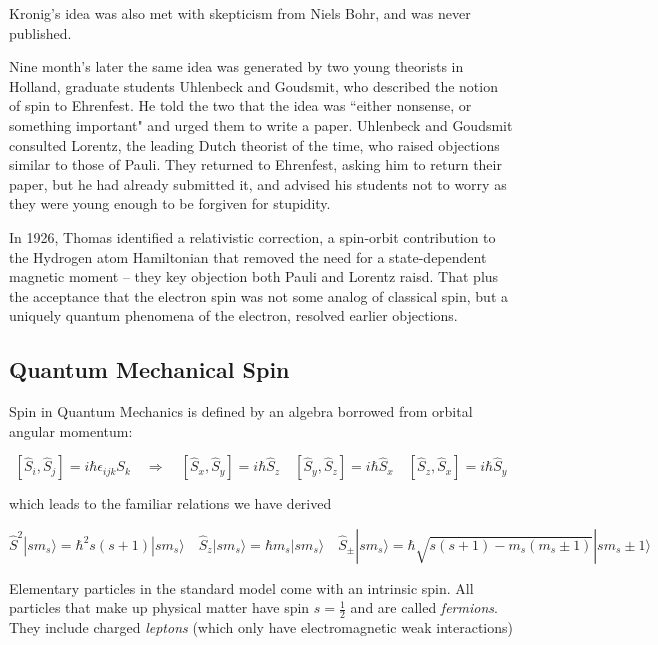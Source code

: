 Kronig's idea was also met with skepticism from Niels Bohr, and was never
published. 

Nine month's later the same idea was generated by two young theorists in
Holland, graduate students Uhlenbeck and Goudsmit, who described the notion of
spin to Ehrenfest. He told the two that the idea was ``either nonsense, or
something important" and urged them to write a paper. Uhlenbeck and Goudsmit
consulted Lorentz, the leading Dutch theorist of the time, who raised
objections similar to those of Pauli. They returned to Ehrenfest, asking him to
return their paper, but he had already submitted it, and advised his students
not to worry as they were young enough to be forgiven for stupidity. 

In 1926, Thomas identified a relativistic correction, a spin-orbit contribution
to the Hydrogen atom Hamiltonian that removed the need for a state-dependent
magnetic moment -- they key objection both Pauli and Lorentz raisd. That plus
the acceptance that the electron spin was not some analog of classical spin,
but a uniquely quantum phenomena of the electron, resolved earlier objections. 


\subsection{Quantum Mechanical Spin} 

Spin in Quantum Mechanics is defined by an algebra borrowed from orbital
angular momentum: 

\[
  [\hat{S}_i, \hat{S}_j ]  = i\hbar \epsilon_{ijk} S_k \quad \Rightarrow \quad
  [\hat{S}_x, \hat{S}_y ] = i\hbar \hat{S}_z \quad [\hat{S}_y, \hat{S}_z]
  = i\hbar \hat{S}_x \quad [\hat{S}_z, \hat{S}_x ] = i\hbar \hat{S}_y 
\] \vspace{3px}

which leads to the familiar relations we have derived 

\[
\hat{S}^2 |sm_s\rangle = \hbar^2 s(s+1)|sm_s\rangle \quad \hat{S}_z |s m_s
\rangle = \hbar m_s | sm_s \rangle \quad  \hat{S}_\pm | sm_s \rangle = \hbar
\sqrt{s(s+1) - m_s (m_s \pm 1 )} |sm_s \pm 1 \rangle
\] \vspace{3px}

Elementary particles in the standard model come with an intrinsic spin. All
particles that make up physical matter have spin $s = \frac{1}{2}$ and are
called \textit{fermions}. They include charged \textit{leptons} (which only
have electromagnetic weak interactions)

